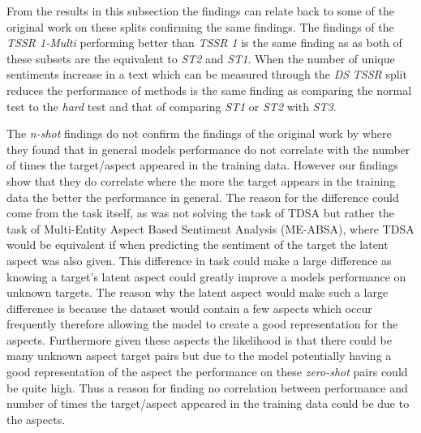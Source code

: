 From the results in this subsection the findings can relate back to some of the original work on these splits confirming the same findings. The findings of the \textit{TSSR 1-Multi} performing better than \textit{TSSR 1} is the same finding as \citet{aug_nguyen-shirai-2015-phrasernn} as both of these subsets are the equivalent to \textit{ST2} and \textit{ST1}. When the number of unique sentiments increase in a text which can be measured through the \textit{DS} \textit{TSSR} split reduces the performance of methods is the same finding as \citet{aug_xue-li-2018-aspect} comparing the normal test to the \textit{hard} test and that of \citet{aug_nguyen-shirai-2015-phrasernn} comparing \textit{ST1} or \textit{ST2} with \textit{ST3}.  

The \textit{n-shot} findings do not confirm the findings of the original work by \citet{aug_yang2018multi} where they found that in general models performance do not correlate with the number of times the target/aspect appeared in the training data. However our findings show that they do correlate where the more the target appears in the training data the better the performance in general. The reason for the difference could come from the task itself, as \citet{aug_yang2018multi} was not solving the task of TDSA but rather the task of Multi-Entity Aspect Based Sentiment Analysis (ME-ABSA), where TDSA would be equivalent if when predicting the sentiment of the target the latent aspect was also given. This difference in task could make a large difference as knowing a target's latent aspect could greatly improve a models performance on unknown targets. The reason why the latent aspect would make such a large difference is because the dataset would contain a few aspects which occur frequently therefore allowing the model to create a good representation for the aspects. Furthermore given these aspects the likelihood is that there could be many unknown aspect target pairs but due to the model potentially having a good representation of the aspect the performance on these \textit{zero-shot} pairs could be quite high. Thus a reason for \citet{aug_yang2018multi} finding no correlation between performance and number of times the target/aspect appeared in the training data could be due to the aspects.

%
%

